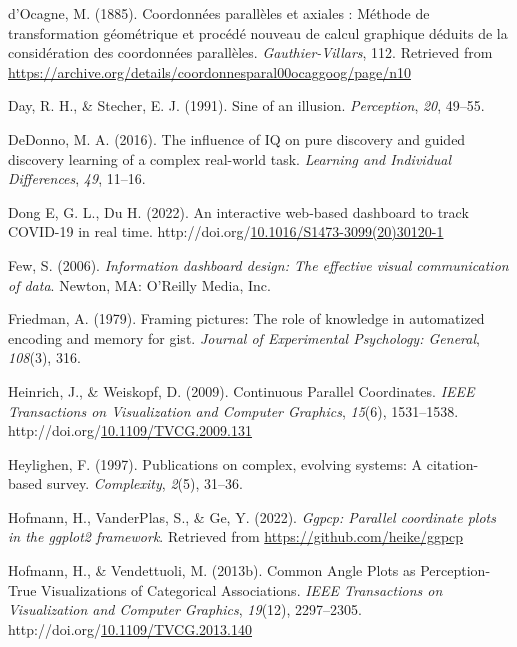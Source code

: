 \documentclass[print]{nuthesis}
\newlength{\cslhangindent}
\newenvironment{CSLReferences}[2]%
{\setlength{\parindent}{0pt}%
\everypar{\setlength{\hangindent}{\cslhangindent}}\ignorespaces}%
{\par}
\begin{document}
\begin{CSLReferences}{1}{0}
\leavevmode{}%
d'Ocagne, M. (1885). {Coordonnées parallèles et axiales : Méthode de transformation géométrique et procédé nouveau de calcul graphique déduits de la considération des coordonnées parallèles}. \emph{Gauthier-Villars}, 112. Retrieved from \url{https://archive.org/details/coordonnesparal00ocaggoog/page/n10}

\leavevmode{}%
Day, R. H., \& Stecher, E. J. (1991). Sine of an illusion. \emph{Perception}, \emph{20}, 49--55.

\leavevmode{}%
DeDonno, M. A. (2016). The influence of IQ on pure discovery and guided discovery learning of a complex real-world task. \emph{Learning and Individual Differences}, \emph{49}, 11--16.

\leavevmode{}%
Dong E, G. L., Du H. (2022). An interactive web-based dashboard to track COVID-19 in real time. http://doi.org/\href{https://doi.org/10.1016/S1473-3099(20)30120-1}{10.1016/S1473-3099(20)30120-1}

\leavevmode{}%
Few, S. (2006). \emph{Information dashboard design: The effective visual communication of data}. Newton, MA: O'Reilly Media, Inc.

\leavevmode{}%
Friedman, A. (1979). Framing pictures: The role of knowledge in automatized encoding and memory for gist. \emph{Journal of Experimental Psychology: General}, \emph{108}(3), 316.

\leavevmode{}%
Heinrich, J., \& Weiskopf, D. (2009). {Continuous Parallel Coordinates}. \emph{IEEE Transactions on Visualization and Computer Graphics}, \emph{15}(6), 1531--1538. http://doi.org/\href{https://doi.org/10.1109/TVCG.2009.131}{10.1109/TVCG.2009.131}

\leavevmode{}%
Heylighen, F. (1997). Publications on complex, evolving systems: A citation-based survey. \emph{Complexity}, \emph{2}(5), 31--36.

\leavevmode{}%
Hofmann, H., VanderPlas, S., \& Ge, Y. (2022). \emph{Ggpcp: Parallel coordinate plots in the ggplot2 framework}. Retrieved from \url{https://github.com/heike/ggpcp}

\leavevmode{}%
Hofmann, H., \& Vendettuoli, M. (2013b). {Common Angle Plots as Perception-True Visualizations of Categorical Associations}. \emph{IEEE Transactions on Visualization and Computer Graphics}, \emph{19}(12), 2297--2305. http://doi.org/\href{https://doi.org/10.1109/TVCG.2013.140}{10.1109/TVCG.2013.140}


\end{CSLReferences}
\end{document}
